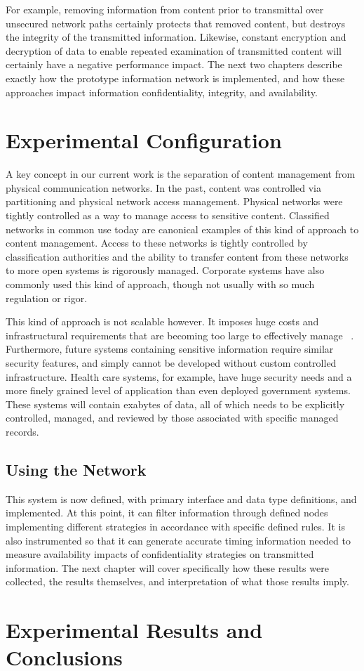 \documentclass[botnum,fleqn,final]{unmeethesis}
\begin{document}
For example, removing information from content prior to transmittal over unsecured network paths certainly protects that removed content, but destroys the integrity of the transmitted information.  Likewise, constant encryption and decryption of data to enable repeated examination of transmitted content will certainly have a negative performance impact.  The next two chapters describe exactly how the prototype information network is implemented, and how these approaches impact information confidentiality, integrity, and availability.

\chapter{Experimental Configuration}
A key concept in our current work is the separation of content management from physical communication networks.  In the past, content was controlled via partitioning and physical network access management.  Physical networks were tightly controlled as a way to manage access to sensitive content.  Classified networks in common use today are canonical examples of this kind of approach to content management.  Access to these networks is tightly controlled by classification authorities and the ability to transfer content from these networks to more open systems is rigorously managed.  Corporate systems have also commonly used this kind of approach, though not usually with so much regulation or rigor.

This kind of approach is not scalable however.  It imposes huge costs and infrastructural requirements that are becoming too large to effectively manage ~\cite{Tallon:2010:UDI:1735223.1735253}.  Furthermore, future systems containing sensitive information require similar security features, and simply cannot be developed without custom controlled infrastructure.  Health care systems, for example, have huge security needs and a more finely grained level of application than even deployed government systems.  These systems will contain exabytes of data, all of which needs to be explicitly controlled, managed, and reviewed by those associated with specific managed records.


\section{Using the Network}
This system is now defined, with primary interface and data type definitions, and implemented.  At this point, it can filter information through defined nodes implementing different strategies in accordance with specific defined rules.  It is also instrumented so that it can generate accurate timing information needed to measure availability impacts of confidentiality strategies on transmitted information.  The next chapter will cover specifically how these results were collected, the results themselves, and interpretation of what those results imply.

\chapter{Experimental Results and Conclusions}



\pagebreak



\end{document}
